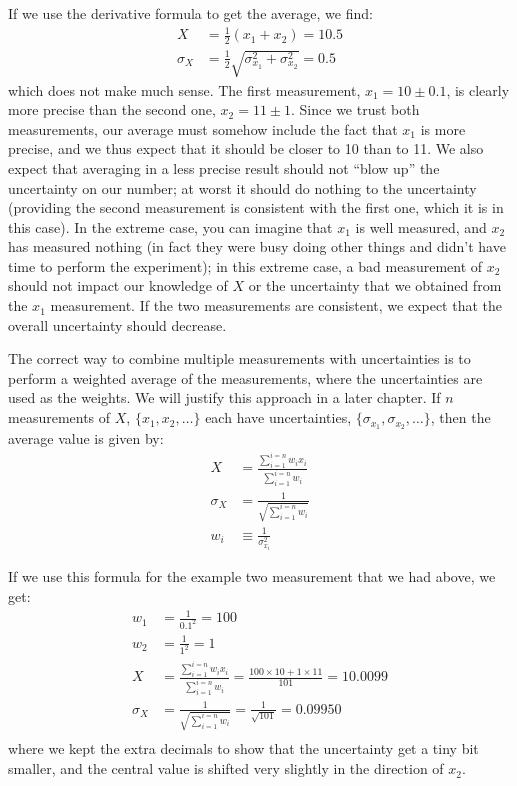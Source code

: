 If we use the derivative formula to get the average, we find:
\begin{align*}
X &= \frac{1}{2} (x_1+x_2)=10.5\\
\sigma_{X} &= \frac{1}{2}\sqrt{\sigma_{x_1}^2+\sigma_{x_2}^2}=0.5
\end{align*}
which does not make much sense. The first measurement, $x_1=10 \pm 0.1$, is clearly more precise than the second one, $x_2=11 \pm 1$. Since we trust both measurements, our average must somehow include the fact that $x_1$ is more precise, and we thus expect that it should be closer to 10 than to 11. We also expect that averaging in a less precise result should not ``blow up'' the uncertainty on our number; at worst it should do nothing to the uncertainty (providing the second measurement is consistent with the first one, which it is in this case). In the extreme case, you can imagine that $x_1$ is well measured, and $x_2$ has measured nothing (in fact they were busy doing other things and didn't have time to perform the experiment); in this extreme case, a bad measurement of $x_2$ should not impact our knowledge of $X$ or the uncertainty that we obtained from the $x_1$ measurement. If the two measurements are consistent, we expect that the overall uncertainty should decrease. 

The correct way to combine multiple measurements with uncertainties is to perform a weighted average of the measurements, where the uncertainties are used as the weights. We will justify this approach in a later chapter. If $n$ measurements of $X$, $\{x_1, x_2 ,\dots\}$ each have uncertainties, $\{\sigma_{x_1}, \sigma_{x_2} ,\dots\}$, then the average value is given by:
\begin{align*}
X &= \frac{\sum_{i=1}^{i=n}w_ix_i}{\sum_{i=1}^{i=n}w_i}\\
\sigma_{X} &= \frac{1}{\sqrt{\sum_{i=1}^{i=n}w_i}}\\
w_i&\equiv\frac{1}{\sigma_{x_i}^2}
\end{align*}

If we use this formula for the example two measurement that we had above, we get:
\begin{align*}
w_1 &= \frac{1}{0.1^2}=100\\
w_2 &= \frac{1}{1^2}=1\\
X &= \frac{\sum_{i=1}^{i=n}w_ix_i}{\sum_{i=1}^{i=n}w_i}=\frac{100\times 10+1\times 11}{101}=10.0099\\
\sigma_{X} &= \frac{1}{\sqrt{\sum_{i=1}^{i=n}w_i}}=\frac{1}{\sqrt{101}}=0.09950\\
\end{align*}
where we kept the extra decimals to show that the uncertainty get a tiny bit smaller, and the central value is shifted very slightly in the direction of $x_2$.

